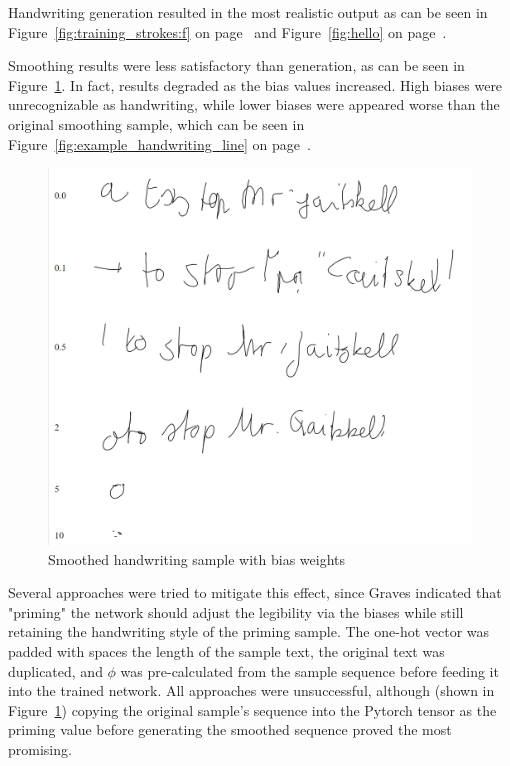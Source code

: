\documentclass{article}
\begin{document}
Handwriting generation resulted in the most realistic output as can be seen in Figure~\ref{fig:training_strokes:f} on page~\pageref{fig:training_strokes} and Figure~\ref{fig:hello} on page~\pageref{fig:hello}.

Smoothing results were less satisfactory than generation, as can be seen in Figure~\ref{fig:smoothed}.  In fact, results degraded as the bias values increased.  High biases were unrecognizable as handwriting, while lower biases were appeared worse than the original smoothing sample, which can be seen in Figure~\ref{fig:example_handwriting_line} on page~\pageref{fig:example_handwriting_line}.

    \begin{figure}[hbt!]
        \includegraphics[width=12cm]{graphics/smooth_with_biases_1.png}
        \centering
        \caption{Smoothed handwriting sample with bias weights}
        \label{fig:smoothed}
    \end{figure}
    
Several approaches were tried to mitigate this effect, since Graves \cite{DBLP:journals/corr/Graves13} indicated that "priming" the network should  adjust the legibility via the biases while still retaining the handwriting style of the priming sample.  The one-hot vector was padded with spaces the length of the sample text, the original text was duplicated, and $\phi$ was pre-calculated from the sample sequence before feeding it into the trained network.  All approaches were unsuccessful, although (shown in Figure~\ref{fig:smoothed}) copying the original sample's sequence into the Pytorch tensor as the priming value before generating the smoothed sequence proved the most promising.
    
\end{document}

